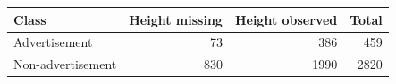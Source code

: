 \begin{tabular}{lrrr}
\toprule
Class & Height missing & Height observed & Total
\\
\midrule
Advertisement & 73 & 386 & 459
\\
Non-advertisement & 830 & 1990 & 2820
\\
\bottomrule
\end{tabular}
